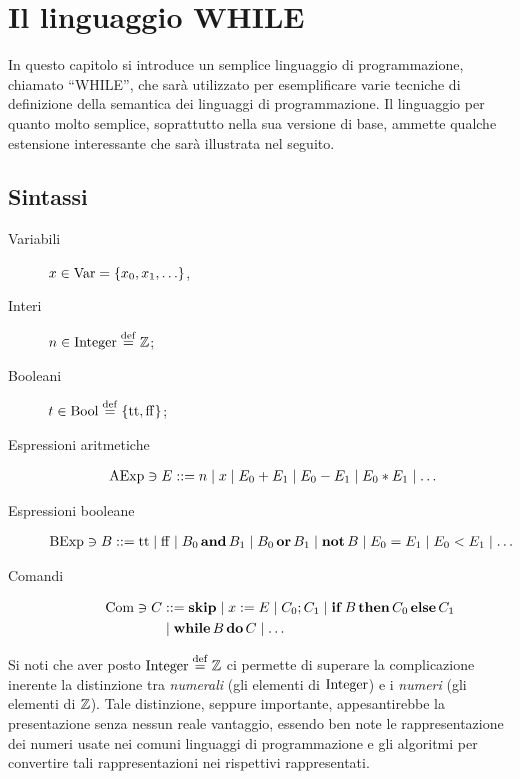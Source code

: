 \chapter{Il linguaggio WHILE}

In questo capitolo si introduce un semplice linguaggio di programmazione,
chiamato ``WHILE'',
che sarà utilizzato per esemplificare varie tecniche di definizione della
semantica dei linguaggi di programmazione.
Il linguaggio per quanto molto semplice, soprattutto nella sua versione di
base, ammette qualche estensione interessante che sarà illustrata nel
seguito.

\section{Sintassi}

\begin{description}
\item[Variabili]
$x \in \mathrm{Var} = \{ x_0, x_1, \ldots \}$,%
\item[Interi]
$n \in \Integer \defeq \Zset$;
\item[Booleani]
$t \in \Bool \defeq \{ \ttv, \ffv \}$;
\item[Espressioni aritmetiche]%
\begin{align*}
  \mathrm{AExp} \ni
  E &::= n \mathrel{\mid} x \mathrel{\mid} E_0 + E_1 \mathrel{\mid} E_0 - E_1 \mathrel{\mid} E_0 * E_1 \mathrel{\mid} \ldots
\end{align*}
\item[Espressioni booleane]%
\begin{align*}
  \mathrm{BExp} \ni
  B &::= \mathrm{tt} \mathrel{\mid} \mathrm{ff} \mathrel{\mid} B_0 \mathop{\textup{\textbf{and}}} B_1 \mathrel{\mid} B_0 \mathop{\textup{\textbf{or}}} B_1
              \mathrel{\mid} \mathop{\textup{\textbf{not}}} B \mathrel{\mid} E_0 = E_1 \mathrel{\mid} E_0 < E_1 \mathrel{\mid} \ldots
\end{align*}
\item[Comandi]%
\begin{align*}
  \mathrm{Com} \ni
  C &::= \mathop{\textup{\textbf{skip}}} \mathrel{\mid} x := E \mathrel{\mid} C_0 ; C_1
         \mathrel{\mid} \mathop{\textup{\textbf{if}}} B \mathop{\textup{\textbf{then}}} C_0 \mathop{\textup{\textbf{else}}} C_1 \\
    &\mathrel{\mid} \mathop{\textup{\textbf{while}}} B \mathop{\textup{\textbf{do}}} C \mathrel{\mid} \ldots
\end{align*}
\end{description}

Si noti che aver posto $\Integer \defeq \Zset$ ci permette di superare
la complicazione inerente la distinzione tra \emph{numerali} (gli elementi
di $\mathrm{Integer}$) e i \emph{numeri} (gli elementi di $\mathbb{Z}$).
Tale distinzione, seppure importante, appesantirebbe la presentazione
senza nessun reale vantaggio, essendo ben note le rappresentazione
dei numeri usate nei comuni linguaggi di programmazione e gli algoritmi
per convertire tali rappresentazioni nei rispettivi rappresentati.

